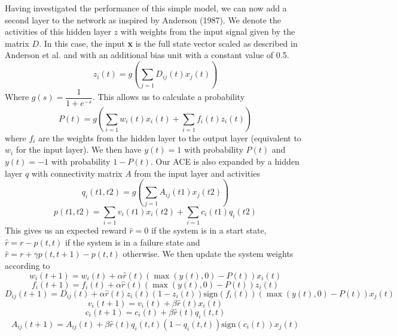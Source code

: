 \documentclass{article}
\begin{document}
Having investigated the performance of this simple model, we can now add a second layer to the network  as inspired by Anderson (1987). We denote the activities of this hidden layer $z$ with weights from the input signal given by the matrix $D$. In this case, the input \textbf{x} is the full state vector scaled as described in Anderson et al. and with an additional bias unit with a constant value of 0.5.
\begin{equation}
z_i(t) = g(\sum_{j=1}{D_{ij}(t) x_j(t)})
\end{equation}
Where $g(s) = \dfrac{1}{1+e^{-s}}$. This allows us to calculate a probability
\begin{equation}
P(t) = g(\sum_{i=1}{w_{i}(t) x_i(t)} + \sum_{i=1}{f_i(t)z_i(t)})
\end{equation}
where $f_i$ are the weights from the hidden layer to the output layer (equivalent to $w_i$ for the input layer).
We then have $y(t) = 1$ with probability $P(t)$ and $y(t) = -1$ with probability $1-P(t)$.
Our ACE is also expanded by a hidden layer  $q$ with connectivity matrix $A$ from the input layer and activities
\begin{equation}
q_i(t1, t2) = g(\sum_{j=1}{A_{ij}(t1) x_j(t2)})
\end{equation}
\begin{equation}
p(t1,t2) = \sum_{i=1}{v_{i}(t1) x_i(t2)} + \sum_{i=1}{c_i(t1)q_i(t2)}
\end{equation}
This gives us an expected reward $\hat r = 0$ if the system is in a start state, $\hat r = r - p(t,t)$ if the system is in a failure state and $\hat r = r + \gamma p(t,t+1) - p(t,t)$ otherwise.
We then update the system weights according to
\begin{equation}
w_i(t+1) = w_i(t) + \alpha \hat r (t)(\max{(y(t), 0)} - P(t))x_i(t)
\end{equation}
\begin{equation}
f_i(t+1) = f_i(t) + \alpha \hat r (t)(\max{(y(t), 0)} - P(t))z_i(t)
\end{equation}
\begin{equation}
D_{ij}(t+1) = D_{ij}(t) + \alpha \hat r (t) z_i(t) (1-z_i(t))\text{sign}(f_i(t)) (\max{(y(t), 0)} - P(t))x_j(t)
\end{equation}
\begin{equation}
v_i(t+1) = v_i(t) + \beta \hat r (t) x_i(t)
\end{equation}
\begin{equation}
c_i(t+1) = c_i(t) + \beta \hat r (t) q_i(t,t)
\end{equation}
\begin{equation}
A_{ij}(t+1) = A_{ij}(t) + \beta \hat r (t) q_i(t,t) (1-q_i(t,t))\text{sign}(c_i(t)) x_j(t)
\end{equation}
\end{document}

